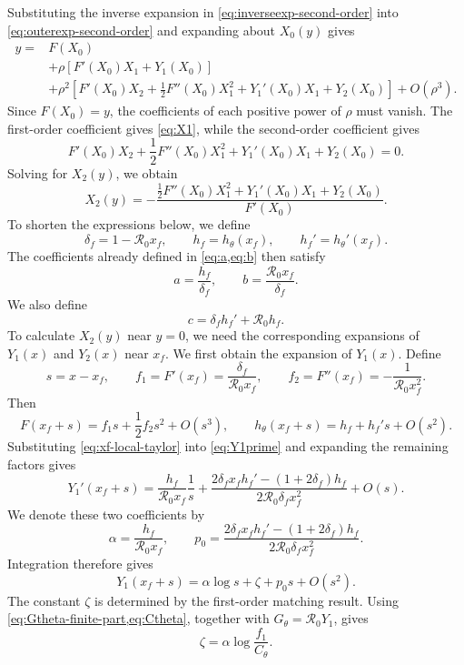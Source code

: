 \documentclass[11pt]{article}
\newcommand{\Rzero}{\mathcal R_0}
\newcommand{\rhoeps}{\rho}
\newcommand{\hth}{h_\theta}
\newcommand{\xf}{x_f}
\newcommand{\Cth}{C_\theta}
\begin{document}
Substituting the inverse expansion in \cref{eq:inverseexp-second-order} into \cref{eq:outerexp-second-order} and expanding about \(X_0(y)\) gives
\[
\begin{aligned}
y={}&F(X_0)\\
&+\rhoeps\left[F'(X_0)X_1+Y_1(X_0)\right]\\
&+\rhoeps^2\left[F'(X_0)X_2+\frac12F''(X_0)X_1^2
+Y_1'(X_0)X_1+Y_2(X_0)\right]+O(\rhoeps^3).
\end{aligned}
\]
Since \(F(X_0)=y\), the coefficients of each positive power of \(\rhoeps\) must vanish. The first-order coefficient gives \cref{eq:X1}, while the second-order coefficient gives
\[
F'(X_0)X_2+\frac12F''(X_0)X_1^2+Y_1'(X_0)X_1+Y_2(X_0)=0.
\]
Solving for \(X_2(y)\), we obtain
\begin{equation}
X_2(y)=
-\frac{\frac12F''(X_0)X_1^2+Y_1'(X_0)X_1+Y_2(X_0)}{F'(X_0)}.
\label{eq:X2general}
\end{equation}
To shorten the expressions below, we define
\begin{equation}
\delta_f=1-\Rzero\xf,\qquad h_f=\hth(\xf),\qquad h_f'=\hth'(\xf).
\label{eq:localdefs1}
\end{equation}
The coefficients already defined in \cref{eq:a,eq:b} then satisfy
\[
a=\frac{h_f}{\delta_f},\qquad b=\frac{\Rzero\xf}{\delta_f}.
\]
We also define
\begin{equation}
c=\delta_f h_f'+\Rzero h_f.
\label{eq:localdefs2}
\end{equation}
To calculate \(X_2(y)\) near \(y=0\), we need the corresponding expansions of \(Y_1(x)\) and \(Y_2(x)\) near \(\xf\). We first obtain the expansion of \(Y_1(x)\). Define
\begin{equation}
s=x-\xf,\qquad f_1=F'(\xf)=\frac{\delta_f}{\Rzero\xf},\qquad
f_2=F''(\xf)=-\frac{1}{\Rzero\xf^2}.
\label{eq:xf-local-derivatives}
\end{equation}
Then
\begin{equation}
F(\xf+s)=f_1s+\frac12f_2s^2+O(s^3),\qquad
\hth(\xf+s)=h_f+h_f's+O(s^2).
\label{eq:xf-local-taylor}
\end{equation}
Substituting \cref{eq:xf-local-taylor} into \cref{eq:Y1prime} and expanding the remaining factors gives
\begin{equation}
Y_1'(\xf+s)=\frac{h_f}{\Rzero\xf}\frac1s
+\frac{2\delta_f\xf h_f'-(1+2\delta_f)h_f}{2\Rzero\delta_f\xf^2}+O(s).
\label{eq:Y1prime-local}
\end{equation}
We denote these two coefficients by
\begin{equation}
\alpha=\frac{h_f}{\Rzero\xf},\qquad
p_0=\frac{2\delta_f\xf h_f'-(1+2\delta_f)h_f}{2\Rzero\delta_f\xf^2}.
\label{eq:p0}
\end{equation}
Integration therefore gives
\begin{equation}
Y_1(\xf+s)=\alpha\log s+\zeta+p_0s+O(s^2).
\label{eq:Y1localapp}
\end{equation}
The constant \(\zeta\) is determined by the first-order matching result. Using \cref{eq:Gtheta-finite-part,eq:Ctheta}, together with \(G_\theta=\Rzero Y_1\), gives
\begin{equation}
\zeta=\alpha\log\frac{f_1}{\Cth}.
\label{eq:zeta}
\end{equation}
\end{document}
